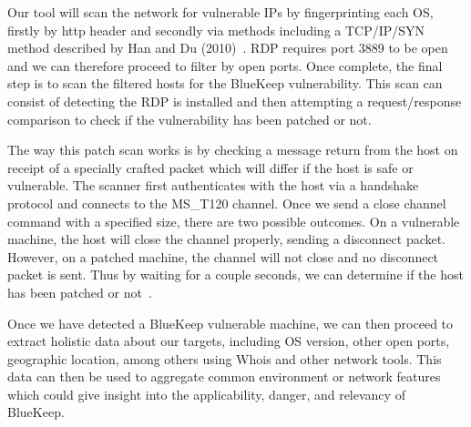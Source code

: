Our tool will scan the network for vulnerable IPs by fingerprinting each OS, firstly by http header and secondly via methods including a TCP/IP/SYN method described by Han and Du (2010)~\cite{han_du_2010}. RDP requires port 3889 to be open and we can therefore proceed to filter by open ports. Once complete, the final step is to scan the filtered hosts for the BlueKeep vulnerability. This scan can consist of detecting the RDP is installed and then attempting a request/response comparison to check if the vulnerability has been patched or not. 

The way this patch scan works is by checking a message return from the host on receipt of a specially crafted packet which will differ if the host is safe or vulnerable. The scanner first authenticates with the host via a handshake protocol and connects to the MS\_T120 channel. Once we send a close channel command with a specified size, there are two possible outcomes. On a vulnerable machine, the host will close the channel properly, sending a disconnect packet. However, on a patched machine, the channel will not close and no disconnect packet is sent. Thus by waiting for a couple seconds, we can determine if the host has been patched or not~\cite{dillon_2019}.

Once we have detected a BlueKeep vulnerable machine, we can then proceed to extract holistic data about our targets, including OS version, other open ports, geographic location, among others using Whois and other network tools. This data can then be used to aggregate common environment or network features which could give insight into the applicability, danger, and relevancy of BlueKeep.